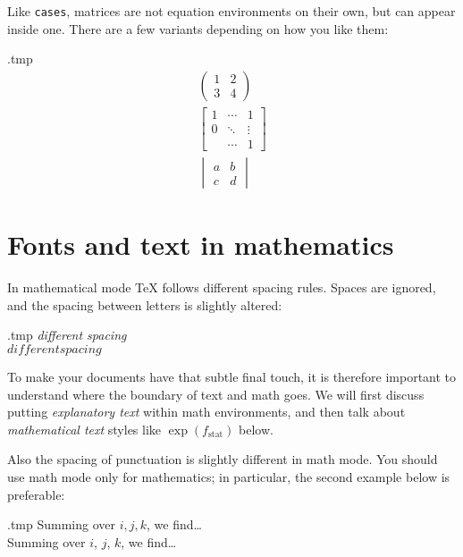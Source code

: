 Like \verb|cases|, matrices are not equation environments on their own,
but can appear inside one.
There are a few variants depending on how you like them:
%
\begin{VerbatimOut}{\jobname.tmp}
\begin{gather*}
\begin{pmatrix}
    1 & 2\\
    3 & 4
\end{pmatrix}\\
\begin{bmatrix}
    1 & \cdots & 1\\
    0 & \ddots & \vdots\\
      & \cdots & 1
\end{bmatrix}\\
\begin{vmatrix}
    a & b\\
    c & d
\end{vmatrix}
\end{gather*}
\end{VerbatimOut}
\ShowExample




%
%
%
\section{Fonts and text in mathematics}

In mathematical mode \TeX{} follows different spacing rules.
Spaces are ignored, and the spacing between letters is slightly altered:
%
\begin{VerbatimOut}{\jobname.tmp}
\emph{different spacing}\\
$different spacing$
\end{VerbatimOut}
\ShowExample
%
To make your documents have that subtle final touch,
it is therefore important to understand where the boundary of text and math goes.
We will first discuss putting \emph{explanatory text} within math environments,
and then talk about \emph{mathematical text} styles like $\exp(f_{\mathrm{stat}})$ below.

\begin{practices}
Also the spacing of punctuation is slightly different in math mode.
You should use math mode only for mathematics;
in particular, the second example below is preferable:
%
\begin{VerbatimOut}{\jobname.tmp}
Summing over $i, j, k$, we find\dots\\
Summing over $i$, $j$, $k$, we find\dots\\
\end{VerbatimOut}
\ShowExample
\end{practices}


